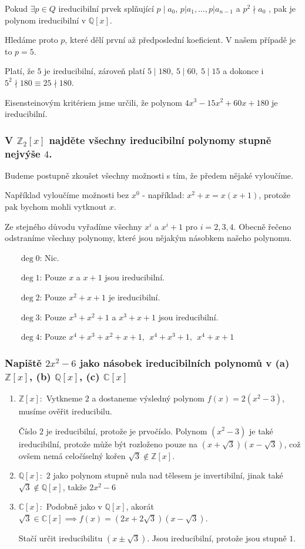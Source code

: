 \documentclass[10pt,a4paper]{article}
\newcommand{\Z}{{\mathbb{Z}}}       %
\newcommand{\Q}{{\mathbb{Q}}}       %
\newcommand{\Cc}{{\mathbb{C}}}      %
\begin{document}
Pokud $\exists p \in Q$ ireducibilní prvek splňující $p \mid a_0$, $p | a_1 ,\dots , p | a_{n-1}$ a $p^2 \nmid a_0$ , pak je polynom ireducibilní v $\Q[x]$. 

Hledáme proto $p$, které dělí první až předposlední koeficient. V našem případě je to $p=5$.

Platí, že $5$ je ireducibilní, zároveň platí $5\mid 180, ~5\mid 60, ~5\mid 15$ a dokonce i $5^2 \nmid 180 \equiv 25 \nmid 180$.

Eisensteinovým kritériem jsme určili, že polynom $4x^3 - 15x^2 + 60x + 180$ je ireducibilní.


\subsubsection{V $\Z_2[x]$ najděte všechny ireducibilní polynomy stupně nejvýše $4$.}

Budeme postupně zkoušet všechny možnosti s tím, že předem nějaké vyloučíme. 

Například vyloučíme možnosti bez $x^0$ - například: $x^2+x=x(x+1)$, protože pak bychom mohli vytknout $x$.

Ze stejného důvodu vyřadíme všechny $x^i$ a $x^i+1$ pro $i={2,3,4}$. Obecně řečeno odstraníme všechny polynomy, které jsou nějakým násobkem našeho polynomu.
\begin{itemize}
    \item [$\deg 0$:] Nic.
    \item [$\deg 1$:] Pouze $x$ a $x+1$ jsou ireducibilní.
    \item [$\deg 2$:] Pouze $x^2+x+1$ je ireducibilní.
    \item [$\deg 3$:] Pouze $x^3+x^2+1$ a $x^3+x+1$ jsou ireducibilní.
    \item [$\deg 4$:] Pouze $x^4+x^3+x^2+x+1, ~~x^4+x^3+1,~~ x^4+x+1$
\end{itemize}

\subsubsection{Napiště $2x^2 - 6$ jako násobek ireducibilních polynomů v (a) $\Z[x]$, (b) $\Q[x]$, (c) $\Cc[x]$}

\begin{enumerate}[label=(\alph*)]
    \item $\Z[x]:$ Vytkneme $2$ a dostaneme výsledný polynom $f(x)=2(x^2-3)$, musíme ověřit ireducibilu.

    Číslo $2$ je ireducibilní, protože je prvočíslo. 
    Polynom $(x^2-3)$ je také ireducibilní, protože může být rozloženo pouze na $(x + \sqrt3)(x- \sqrt3)$, což ovšem nemá celočíselný kořen $\sqrt3 \notin \Z[x]$.
    \item $\Q[x]:$ $2$ jako polynom stupně nula nad tělesem je invertibilní, jinak také $\sqrt{3} \notin \Q[x]$, takže $2x^2-6$
    \item $\Cc[x]:$ Podobně jako v $\Q[x]$, akorát $\sqrt{3}\in \Cc[x] \implies f(x)=(2x + 2\sqrt 3)(x -\sqrt3)$. 
        
    Stačí určit ireducibilitu $(x \pm \sqrt{3})$. Jsou ireducibilní, protože jsou stupně $1$. 
\end{enumerate}    
\end{document}
